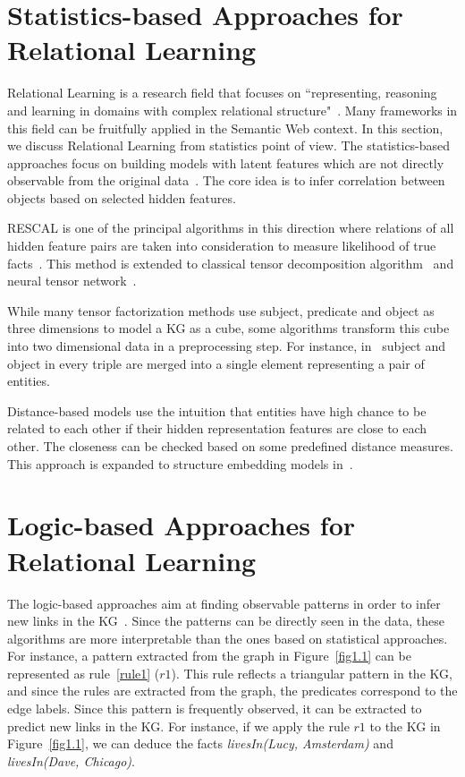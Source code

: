 \section{Statistics-based Approaches for Relational Learning}

Relational Learning is a research field that focuses on ``representing, reasoning and learning in domains with complex relational structure"~\cite{ref43}. Many frameworks in this field can be fruitfully applied in the Semantic Web context. In this section, we discuss Relational Learning from statistics point of view. The statistics-based approaches focus on building models with latent features which are not directly observable from the original data~\cite{ref1}. The core idea is to infer correlation between objects based on selected hidden features.

RESCAL is one of the principal algorithms in this direction where relations of all hidden feature pairs are taken into consideration to measure likelihood of true facts~\cite{ref2, ref3}. This method is extended to classical tensor decomposition algorithm~\cite{ref4} and neural tensor network~\cite{ref5}.

While many tensor factorization methods use subject, predicate and object as three dimensions to model a KG as a cube, some algorithms transform this cube into two dimensional data in a preprocessing step. For instance, in~\cite{ref6, ref7} subject and object in every triple are merged into a single element representing a pair of entities.%

Distance-based models use the intuition that entities have high chance to be related to each other if their hidden representation features are close to each other. The closeness can be checked based on some predefined distance measures. This approach is expanded to structure embedding models in~\cite{ref8}.

\section{Logic-based Approaches for Relational Learning}

The logic-based approaches aim at finding observable patterns in order to infer new links in the KG~\cite{ref1}. Since the patterns can be directly seen in the data, these algorithms are more interpretable than the ones based on statistical approaches. For instance, a pattern extracted from the graph in Figure~\ref{fig1.1} can be represented as rule~\ref{rule1} ($r1$). This rule reflects a triangular pattern in the KG, and since the rules are extracted from the graph, the predicates correspond to the edge labels. Since this pattern is frequently observed, it can be extracted to predict new links in the KG. For instance, if we apply the rule $r1$ to the KG in Figure~\ref{fig1.1}, we can deduce the facts \textit{livesIn(Lucy, Amsterdam)} and \textit{livesIn(Dave, Chicago)}.

